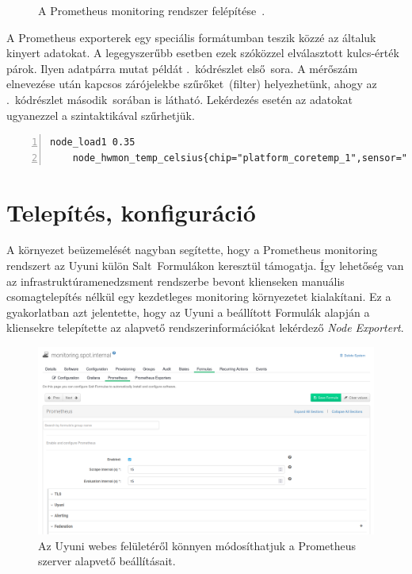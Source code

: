 \vspace{0.25cm}
\begin{figure}[ht]
	\centering
	
	\caption{A Prometheus monitoring rendszer felépítése~\cite{PrometheusIntro}.}
	\label{fig:prometheus-architecture}
\end{figure}

A Prometheus exporterek egy speciális formátumban teszik közzé az általuk kinyert adatokat. A legegyszerűbb esetben ezek szóközzel elválasztott kulcs-érték párok. Ilyen adatpárra mutat példát .~kódrészlet első~sora. A mérőszám elnevezése után kapcsos zárójelekbe szűrőket~(filter) helyezhetünk, ahogy az .~kódrészlet második~sorában is látható. Lekérdezés esetén az adatokat ugyanezzel a szintaktikával szűrhetjük.

\begin{lstlisting}[caption=Prometheus exporterek által közzétett adatok.,label=lst:prometheus-data-format, numbers=left]
	node_load1 0.35
	node_hwmon_temp_celsius{chip="platform_coretemp_1",sensor="temp2"} 28
\end{lstlisting}

\section{Telepítés, konfiguráció}
A környezet beüzemelését nagyban segítette, hogy a Prometheus monitoring rendszert az Uyuni külön Salt~Formulákon keresztül támogatja. Így lehetőség van az infrastruktúramenedzsment rendszerbe bevont klienseken manuális csomagtelepítés nélkül egy kezdetleges monitoring környezetet kialakítani. Ez a gyakorlatban azt jelentette, hogy az Uyuni a beállított Formulák alapján a kliensekre telepítette az alapvető rendszerinformációkat lekérdező \textit{Node Exportert}.


\begin{figure}[ht]
	\centering
	\includegraphics[width=15cm]{figures/prometheus-formula.png}
	\caption{Az Uyuni webes felületéről könnyen módosíthatjuk a Prometheus szerver alapvető beállításait.}
	\label{fig:prometheus-formula}
\end{figure}

